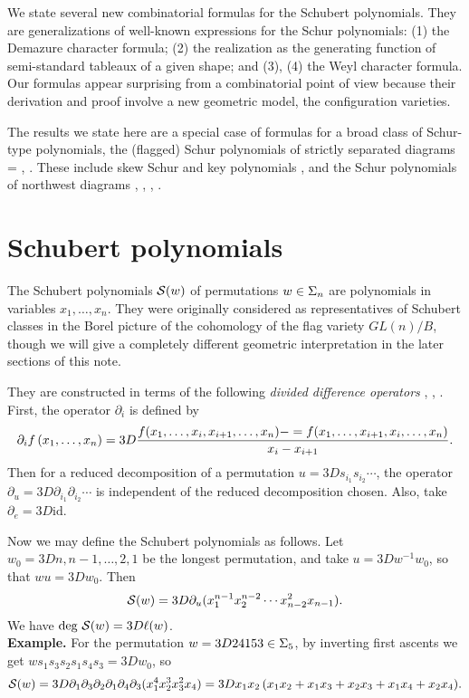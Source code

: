 \maketitle

%

\noindent
We  state several new combinatorial formulas for
the Schubert polynomials.
They are generalizations of well-known expressions
for the Schur polynomials:
(1) the Demazure character formula;
(2) the realization as the generating function of
semi-standard tableaux of a given shape;
and (3), (4) the Weyl character formula.
Our formulas appear surprising
from a combinatorial point of view because
their derivation and proof
involve a new geometric model, the configuration varieties.

The results we state here are a special case of
formulas for a broad class of Schur-type polynomials,
the (flagged) Schur polynomials of strictly separated diagrams =
\cite{LZ},
\cite{BFZ}.
These include skew Schur and key polynomials
\cite{LS3}, and the Schur polynomials of northwest diagrams
\cite{Mag1},
\cite{Mag2}, \cite{RS1}, \cite{RS2}.

\section{Schubert polynomials}

The Schubert polynomials ${\cal S}(w)$ of
permutations $w \in {\Sigma}_n$ are polynomials
in variables $x_1,\ldots,x_n$.
They were originally considered as representatives of
Schubert classes in the Borel picture of the cohomology of
the flag variety $GL(n)/B$, though we will give a completely
different geometric interpretation in the later sections of
this note.

They are constructed in terms of
the following {\em divided difference operators}
\cite{Dem}, \cite{LS1}, \cite{MacD}.
First, the operator $\partial_i$ is defined by
$$
\partial_i f\,(x_1,\ldots,x_n) =3D
{f(x_1,\ldots,x_i,x_{i+1},\ldots,x_n) - =
f(x_1,\ldots,x_{i+1},x_i,\ldots,x_n)
\over x_i - x_{i+1}
}.
$$
Then for a reduced decomposition of a
permutation $u =3D s_{i_1} s_{i_2} \cdots$,
the operator
$\partial_u =3D \partial_{i_1} \partial_{i_2} \cdots$
is independent of the reduced decomposition chosen.
Also, take $\partial_e =3D \mbox{id}$.

Now we may define the Schubert polynomials as follows.
Let $w_0 =3D n, n-1, \ldots, 2, 1$
be the longest permutation,
and take $u =3D w^{-1} w_0$, so that $wu =3D w_0$.
Then
$$
{\cal S}(w) =3D
\partial_u(x_1^{n-1} x_2^{n-2} \cdots x_{n-2}^2 x_{n-1}).
$$
We have $\mbox{deg } {\cal S}(w) =3D \ell(w)$.
\\[1em]
{\bf Example.}
For the permutation $w =3D 24153 \in {\Sigma}_5$,
by inverting first ascents we get
$w s_1 s_3 s_2 s_1 s_4 s_3 =3D w_0$,
so
$$
{\cal S}(w) =3D \partial_1 \partial_3 \partial_2 \partial_1 \partial_4
\partial_3(x_1^4 x_2^3 x_3^2 x_4)
=3D x_1 x_2\, (x_1 x_2 + x_1 x_3 + x_2 x_3 + x_1 x_4 + x_2 x_4).
$$

